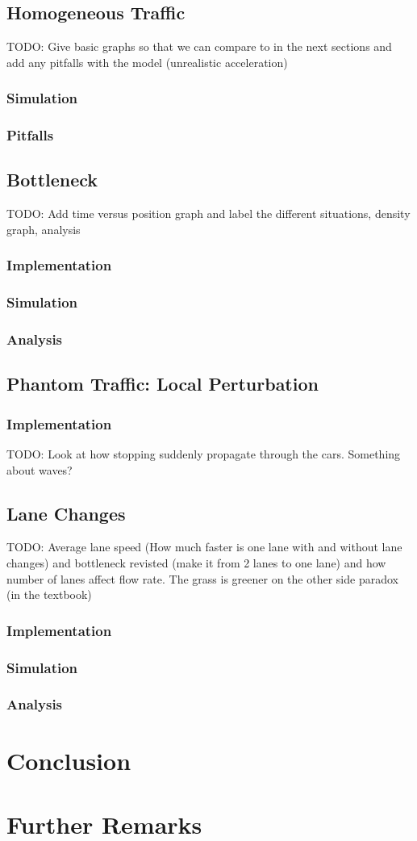 \documentclass[12pt]{article}
\begin{document}
    \subsection{Homogeneous Traffic}
    TODO: Give basic graphs so that we can compare to in the next sections and add any pitfalls with the model (unrealistic acceleration)
    \subsubsection{Simulation}
    \subsubsection{Pitfalls}
    \subsection{Bottleneck}
    TODO: Add time versus position graph and label the different situations, density graph, analysis 
    \subsubsection{Implementation}
    \subsubsection{Simulation}
    \subsubsection{Analysis}
    \subsection{Phantom Traffic: Local Perturbation}
    \subsubsection{Implementation}
    TODO: Look at how stopping suddenly propagate through the cars. Something about waves? 
    \subsection{Lane Changes}
    TODO: Average lane speed (How much faster is one lane with and without lane changes) and bottleneck revisted (make it from 2 lanes to one lane) and how number of lanes affect flow rate. The grass is greener on the other side paradox (in the textbook) 
    \subsubsection{Implementation}
    \subsubsection{Simulation}
    \subsubsection{Analysis}
    \section{Conclusion}
    \section{Further Remarks}
    \printunsrtglossary[type=symbols,style=long,title={List of Symbols and Constants}]
    \newpage 
    \printbibliography
\end{document}
